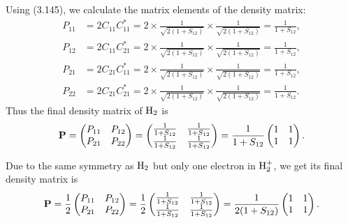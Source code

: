 \documentclass[a4paper]{book}
\newcounter{solution}[chapter]
\begin{document}
	\begin{solution}
	
	Using (3.145), we calculate the matrix elements of the density matrix:
	\begin{align*}
		P_{11} &= 2 C_{11} C^*_{11} = 2 \times \frac{1}{ \sqrt{ 2(1+S_{12}) } } \times \frac{1}{ \sqrt{ 2(1+S_{12}) } }  = \frac{ 1 }{ 1 + S_{12} } , \\
		P_{12} &= 2 C_{11} C^*_{21} = 2 \times \frac{1}{ \sqrt{ 2(1+S_{12}) } } \times \frac{1}{ \sqrt{ 2(1+S_{12}) } }  = \frac{ 1 }{ 1 + S_{12} } , \\
		P_{21} &= 2 C_{21} C^*_{11} = 2 \times \frac{1}{ \sqrt{ 2(1+S_{12}) } } \times \frac{1}{ \sqrt{ 2(1+S_{12}) } }  = \frac{ 1 }{ 1 + S_{12} } , \\
		P_{22} &= 2 C_{21} C^*_{21} = 2 \times \frac{1}{ \sqrt{ 2(1+S_{12}) } } \times \frac{1}{ \sqrt{ 2(1+S_{12}) } }  = \frac{ 1 }{ 1 + S_{12} } .
	\end{align*}
	Thus the final density matrix of $\ce{H2}$ is
	\[
		{\bf P} = \begin{pmatrix}
			P_{11} & P_{12} \\ P_{21} & P_{22} 
		\end{pmatrix} = \begin{pmatrix}
			\frac{ 1 }{ 1 + S_{12} } & \frac{ 1 }{ 1 + S_{12} } \\ \frac{ 1 }{ 1 + S_{12} } & \frac{ 1 }{ 1 + S_{12} }
		\end{pmatrix} = \frac{ 1 }{ 1 + S_{12} } \begin{pmatrix}
			1 & 1 \\ 1 & 1
		\end{pmatrix} .
	\]
	
	Due to the same symmetry as $\ce{H2}$ but only one electron in ${\rm H}^+_2$, we get its final density matrix is
	\[
		{\bf P} = \frac{1}{2} \begin{pmatrix}
			P_{11} & P_{12} \\ P_{21} & P_{22} 
		\end{pmatrix} = \frac{1}{2}\begin{pmatrix}
			\frac{ 1 }{ 1 + S_{12} } & \frac{ 1 }{ 1 + S_{12} } \\ \frac{ 1 }{ 1 + S_{12} } & \frac{ 1 }{ 1 + S_{12} }
		\end{pmatrix} = \frac{ 1 }{ 2( 1 + S_{12} ) } \begin{pmatrix}
			1 & 1 \\ 1 & 1
		\end{pmatrix} .
	\]
	
	\end{solution}
\end{document}
